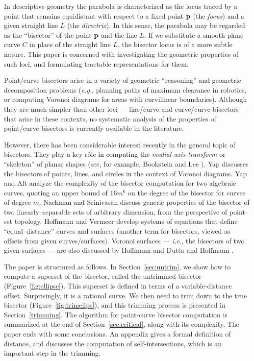 In descriptive geometry \cite{coxeter69} the parabola is
characterized as the locus traced by a point that remains
equidistant with respect to a fixed point ${\bf p}$ (the
{\it focus\/}) and a given straight line $L$ (the {\it
directrix\/}). In this sense, the parabola may be
regarded as the ``bisector'' of the point ${\bf p}$ and
the line $L$.
If we substitute a smooth plane curve $C$ in place of
the straight line $L$, the bisector locus is of a more
subtle nature. This paper is concerned with investigating
the geometric properties of such loci, and formulating
tractable representations for them. 

Point/curve bisectors
arise in a variety of geometric ``reasoning'' and geometric
decomposition problems ({\it e.g.}, planning paths of maximum
clearance in robotics, or computing Voronoi diagrams for areas
with curvilinear boundaries). Although they are much simpler
than other loci --- line/curve and curve/curve bisectors ---
that arise in these contexts, no systematic analysis of the
properties of point/curve bisectors is currently available
in the literature.

However, there has been considerable interest recently in
the general topic of bisectors. They play a key r\^ole in
computing the {\it medial axis transform\/} or ``skeleton''
of planar shapes (see, for example, Bookstein \cite{bookstein79}
and Lee \cite{lee82}). Yap \cite{yap87} discusses the bisectors
of points, lines, and circles in the context of Voronoi diagrams.
Yap and Alt \cite{yap89} analyze
the complexity of the bisector computation for two algebraic
curves, quoting an upper bound of $16m^6$ on the degree of
the bisector for curves of degree $m$. Nackman and Srinivasan
\cite{nackman91} discuss generic properties of the bisector of
two linearly--separable sets of arbitrary dimension, from the
perspective of point--set topology.
Hoffmann and Vermeer \cite{HV91} develop systems of equations
that define ``equal--distance'' curves and surfaces (another
term for bisectors, viewed as offsets from given curves/surfaces).
Voronoi surfaces --- {\it i.e.}, the bisectors of two given
surfaces --- are also discussed by Hoffmann \cite{H90} and Dutta
and Hoffmann \cite{DH90}.

The paper is structured as follows.
In Section~\ref{sec:untrim}, we show how to compute 
a superset of the bisector, called the untrimmed bisector 
(Figure~\ref{fig:ellipse}).
This superset is defined in terms of a variable-distance offset.
Surprisingly, it is a rational curve.
We then need to trim down to the true bisector (Figure~\ref{fig:trimellps}),
and this trimming process is presented in Section~\ref{trimming}.
The algorithm for point-curve bisector computation is summarized
at the end of Section~\ref{sec:critical}, along with its complexity.
The paper ends with some conclusions.
An appendix gives a formal definition of distance,
and discusses the computation of 
self-intersections, which is an important step in the trimming.

